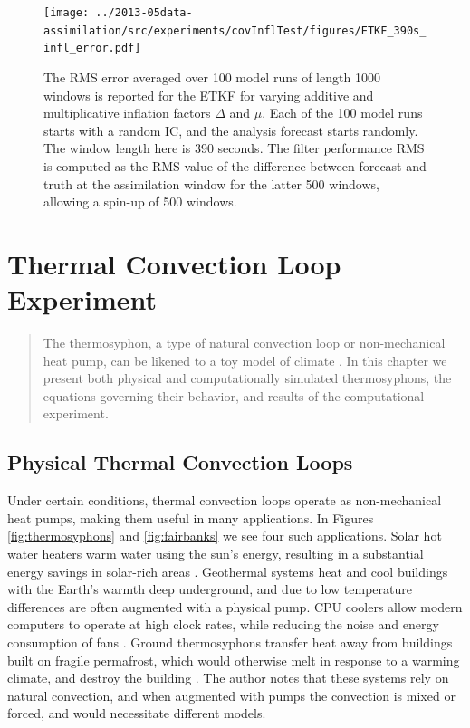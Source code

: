 \documentclass[12pt]{report}
\begin{document}
\begin{figure}[h!]
  \centering
  \texttt{[image: ../2013-05data-assimilation/src/experiments/covInflTest/figures/ETKF\_390s\_infl\_error.pdf]}
  \caption[The RMS error averaged over 100 model runs of length 1000 windows is reported for the ETKF for varying additive and multiplicative inflation factors]{
    The RMS error averaged over 100 model runs of length 1000 windows is reported for the ETKF for varying additive and multiplicative inflation factors $\Delta$ and $\mu$.
    Each of the 100 model runs starts with a random IC, and the analysis forecast starts randomly.
    The window length here is 390 seconds.
    The filter performance RMS is computed as the RMS value of the difference between forecast and truth at the assimilation window for the latter 500 windows, allowing a spin-up of 500 windows.
  }
  \label{fig:ETKF_cov_tuning_390s}

\end{figure}

\chapter{Thermal Convection Loop Experiment}
\begin{quote}
The thermosyphon, a type of natural convection loop or non-mechanical heat pump, can be likened to a toy model of climate .
In this chapter we present both physical and computationally simulated thermosyphons, the equations governing their behavior, and results of the computational experiment.
\end{quote}

\section{Physical Thermal Convection Loops}

Under certain conditions, thermal convection loops operate as non-mechanical heat pumps, making them useful in many applications.
In Figures \ref{fig:thermosyphons} and \ref{fig:fairbanks} we see four such applications.
Solar hot water heaters warm water using the sun's energy, resulting in a substantial energy savings in solar-rich areas .
Geothermal systems heat and cool buildings with the Earth's warmth deep underground, and due to low temperature differences are often augmented with a physical pump.
CPU coolers allow modern computers to operate at high clock rates, while reducing the noise and energy consumption of fans .
Ground thermosyphons transfer heat away from buildings built on fragile permafrost, which would otherwise melt in response to a warming climate, and destroy the building .
The author notes that these systems rely on natural convection, and when augmented with pumps the convection is mixed or forced, and would necessitate different models.
\end{document}
